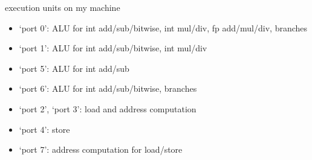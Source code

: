 

\begin{frame}{execution units on my machine}
    \begin{itemize}
    \item `port 0': ALU for int add/sub/bitwise, int mul/div, fp add/mul/div, branches
    \item `port 1': ALU for int add/sub/bitwise, int mul/div
    \item `port 5': ALU for int add/sub
    \item `port 6': ALU for int add/sub/bitwise, branches
    \item `port 2', `port 3': load and address computation
    \item `port 4': store
    \item `port 7': address computation for load/store
    \end{itemize}
\end{frame}
